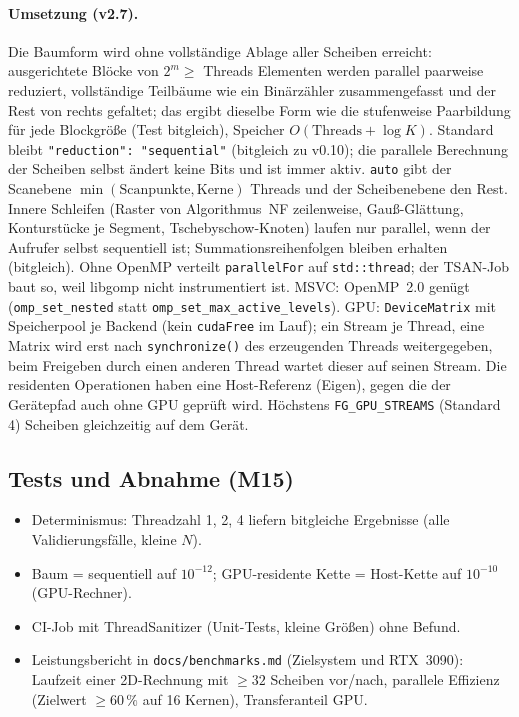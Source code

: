 \paragraph{Umsetzung (v2.7).} Die Baumform wird ohne vollständige Ablage aller Scheiben erreicht: ausgerichtete
Blöcke von $2^m\ge$ Threads Elementen werden parallel paarweise reduziert, vollständige Teilbäume wie ein
Binärzähler zusammengefasst und der Rest von rechts gefaltet; das ergibt dieselbe Form wie die stufenweise
Paarbildung für jede Blockgröße (Test bitgleich), Speicher $O(\text{Threads}+\log K)$. Standard bleibt
\verb!"reduction": "sequential"! (bitgleich zu v0.10); die parallele Berechnung der Scheiben selbst ändert keine Bits und
ist immer aktiv. \verb|auto| gibt der Scanebene $\min(\text{Scanpunkte},\text{Kerne})$ Threads und der Scheibenebene den
Rest. Innere Schleifen (Raster von Algorithmus~NF zeilenweise, Gauß-Glättung, Konturstücke je Segment,
Tschebyschow-Knoten) laufen nur parallel, wenn der Aufrufer selbst sequentiell ist; Summationsreihenfolgen bleiben
erhalten (bitgleich). Ohne OpenMP verteilt \verb|parallelFor| auf \verb|std::thread|; der TSAN-Job baut so, weil
libgomp nicht instrumentiert ist. MSVC: OpenMP~2.0 genügt (\verb|omp_set_nested| statt \verb|omp_set_max_active_levels|).
GPU: \verb|DeviceMatrix| mit Speicherpool je Backend (kein \verb|cudaFree| im Lauf); ein Stream je Thread, eine Matrix
wird erst nach \verb|synchronize()| des erzeugenden Threads weitergegeben, beim Freigeben durch einen anderen Thread
wartet dieser auf seinen Stream. Die residenten Operationen haben eine Host-Referenz (Eigen), gegen die der
Gerätepfad auch ohne GPU geprüft wird. Höchstens \verb|FG_GPU_STREAMS| (Standard 4) Scheiben gleichzeitig auf dem Gerät.

\subsection{Tests und Abnahme (M15)}
\begin{itemize}[nosep]
  \item Determinismus: Threadzahl 1, 2, 4 liefern bitgleiche Ergebnisse (alle Validierungsfälle, kleine $N$).
  \item Baum = sequentiell auf $10^{-12}$; GPU-residente Kette = Host-Kette auf $10^{-10}$ (GPU-Rechner).
  \item CI-Job mit ThreadSanitizer (Unit-Tests, kleine Größen) ohne Befund.
  \item Leistungsbericht in \verb|docs/benchmarks.md| (Zielsystem und RTX~3090): Laufzeit einer 2D-Rechnung mit
        $\ge32$ Scheiben vor/nach, parallele Effizienz (Zielwert $\ge60\,\%$ auf 16 Kernen), Transferanteil GPU.
\end{itemize}


